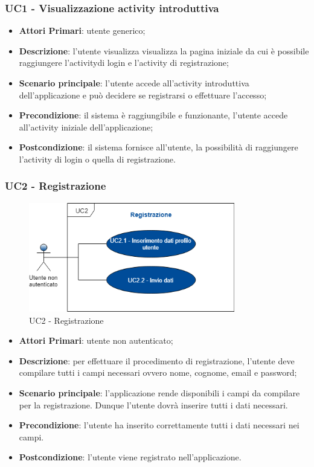 
\subsubsection{UC1 - Visualizzazione activity introduttiva}
\begin{itemize}
	\item \textbf{Attori Primari}: utente generico;
	\item \textbf{Descrizione}: l'utente visualizza visualizza la pagina iniziale da cui è possibile raggiungere l'activity\glosp di login e l'activity di registrazione;
	\item \textbf{Scenario principale}: l'utente accede all'activity introduttiva dell'applicazione e può decidere se registrarsi o effettuare l'accesso;
	\item \textbf{Precondizione}: il sistema è raggiungibile e funzionante, l'utente accede all'activity iniziale dell'applicazione;
	\item \textbf{Postcondizione}: il sistema fornisce all'utente, la possibilità di raggiungere l'activity di login o quella di registrazione.
	
	
\end{itemize}
\subsubsection{UC2 - Registrazione}
\begin{figure}[h]
	\includegraphics[width=9cm]{res/images/UC2Registrazione.png}
	\centering
	\caption{UC2 - Registrazione}
\end{figure}
\begin{itemize}
	\item \textbf{Attori Primari}: utente non autenticato;
	\item \textbf{Descrizione}: per effettuare il procedimento di registrazione, l'utente deve compilare tutti i campi necessari ovvero nome, cognome, email e password;
	\item \textbf{Scenario principale}: l'applicazione rende disponibili i campi da compilare per la registrazione. Dunque l'utente dovrà inserire tutti i dati necessari.
		
	\item \textbf{Precondizione}: l'utente ha inserito correttamente tutti i dati necessari nei campi.
	\item \textbf{Postcondizione}: l'utente viene registrato nell'applicazione. 
	
\end{itemize}
